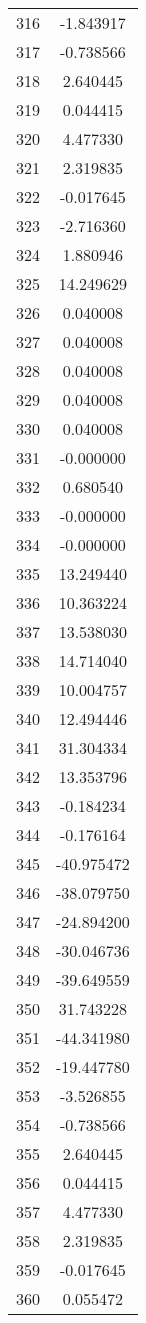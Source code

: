\documentclass[12pt]{article}
\begin{document}
\begin{longtable}{@{}cc@{}}
316 & -1.843917 \\
317 & -0.738566 \\
318 & 2.640445 \\
319 & 0.044415 \\
320 & 4.477330 \\
321 & 2.319835 \\
322 & -0.017645 \\
323 & -2.716360 \\
324 & 1.880946 \\
325 & 14.249629 \\
326 & 0.040008 \\
327 & 0.040008 \\
328 & 0.040008 \\
329 & 0.040008 \\
330 & 0.040008 \\
331 & -0.000000 \\
332 & 0.680540 \\
333 & -0.000000 \\
334 & -0.000000 \\
335 & 13.249440 \\
336 & 10.363224 \\
337 & 13.538030 \\
338 & 14.714040 \\
339 & 10.004757 \\
340 & 12.494446 \\
341 & 31.304334 \\
342 & 13.353796 \\
343 & -0.184234 \\
344 & -0.176164 \\
345 & -40.975472 \\
346 & -38.079750 \\
347 & -24.894200 \\
348 & -30.046736 \\
349 & -39.649559 \\
350 & 31.743228 \\
351 & -44.341980 \\
352 & -19.447780 \\
353 & -3.526855 \\
354 & -0.738566 \\
355 & 2.640445 \\
356 & 0.044415 \\
357 & 4.477330 \\
358 & 2.319835 \\
359 & -0.017645 \\
360 & 0.055472 \\

\end{longtable}
\end{document}
